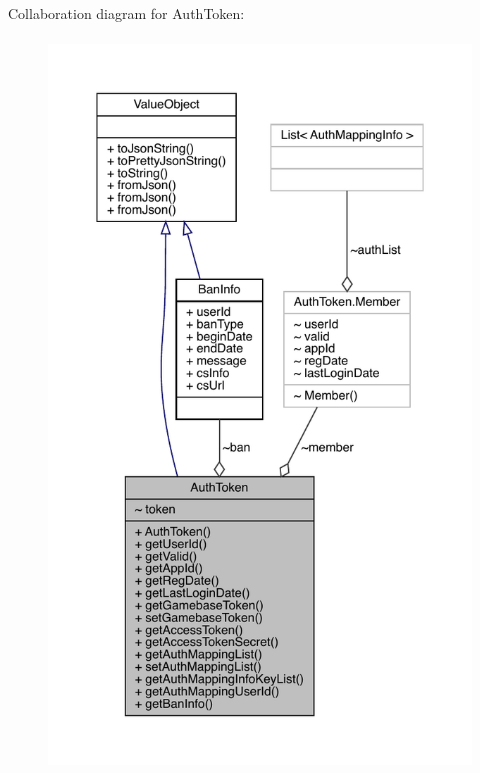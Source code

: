 Collaboration diagram for Auth\+Token\+:\nopagebreak
\begin{figure}[H]
\begin{center}
\leavevmode
\includegraphics[height=550pt]{classcom_1_1toast_1_1android_1_1gamebase_1_1auth_1_1data_1_1_auth_token__coll__graph}
\end{center}
\end{figure}
